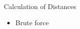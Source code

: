 
\begin{frame}{Calculation of Distances}
	\begin{itemize}
	\item Brute force
	\end{itemize}
\end{frame}
